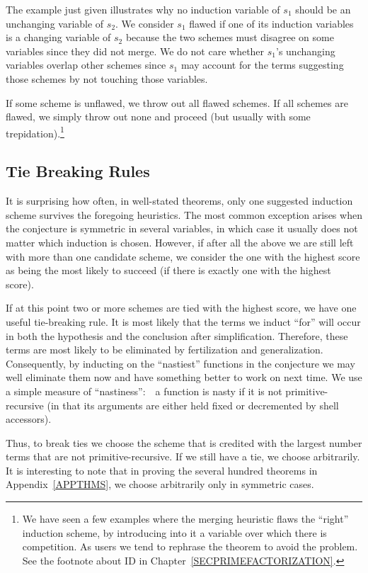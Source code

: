 \documentclass[10pt]{book}
\begin{document}
The example
just given illustrates why no induction variable of $s_{1}$ should be an unchanging
variable of $s_{2}$.   We consider $s_{1}$ flawed if one of its induction
variables is a changing variable
of $s_{2}$ because the two schemes must disagree on some variables since they
did not merge.  We do not care whether $s_{1}$'s unchanging variables
overlap other schemes since $s_{1}$ may account for the terms suggesting those schemes
by not touching those variables.

If some scheme is unflawed, we throw out all flawed schemes.  If all
schemes are flawed, we simply throw out none
and proceed (but usually with some trepidation).\footnote{We have seen a few examples where the merging heuristic flaws the ``right'' induction scheme, by introducing into it a variable over which there is competition.  As users we tend to rephrase the theorem to avoid the problem. See the footnote about ID in Chapter~\ref{SECPRIMEFACTORIZATION}.}

\subsection{Tie Breaking Rules}
It is surprising how often, in well-stated theorems, only one
suggested induction scheme survives the foregoing heuristics.
The most common exception arises  when the conjecture is symmetric in several
variables, in which case it usually does not matter which induction
is chosen.  However, if after all the above we are still left
with more than one candidate scheme, we consider the one with the
highest score as being the most likely to succeed (if there is exactly
one with the highest score).

If at this point two or more schemes are tied with the highest
score, we have  one useful tie-breaking rule.  It is most likely that the
terms we induct ``for'' will occur in both the hypothesis and the conclusion
after simplification.  Therefore, these terms are most likely
to be eliminated by fertilization and generalization.  Consequently,
by inducting on the ``nastiest'' functions in the conjecture we may
well eliminate them now and have something better to work on
next time.  We use a simple measure of ``nastiness'':~~a function is nasty
if it is not primitive-recursive (in that its arguments are either held fixed
or decremented by shell accessors).

Thus, to break ties we choose the scheme that is credited with the 
largest number terms that are not primitive-recursive.  If we still have a tie,
we choose arbitrarily.  It is interesting to note that in proving
the several hundred theorems in Appendix~\ref{APPTHMS}, we choose arbitrarily only in symmetric cases.
\end{document}
